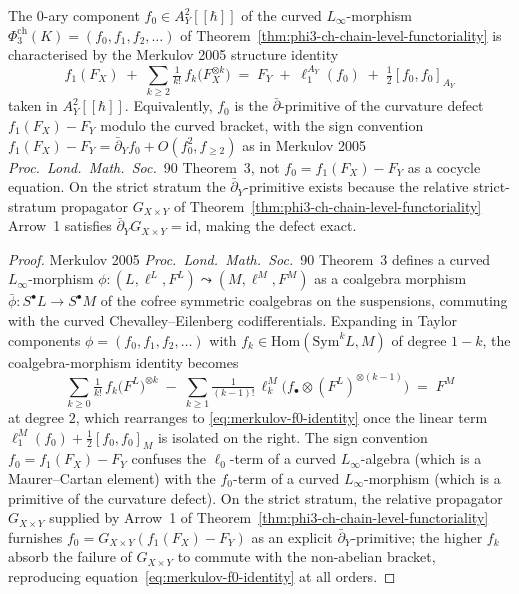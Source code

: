 \begin{proposition}
\label{prop:merkulov-sign-f0}
The $0$-ary component $f_0 \in A_Y^2[\![\hbar]\!]$ of the curved $L_\infty$-morphism $\Phi_3^{\mathrm{ch}}(K) = (f_0, f_1, f_2, \ldots)$ of Theorem~\ref{thm:phi3-ch-chain-level-functoriality} is characterised by the Merkulov 2005 structure identity
\begin{equation}
\label{eq:merkulov-f0-identity}
 f_1(F_X) \;+\; \sum_{k \geq 2} \tfrac{1}{k!}\, f_k\bigl(F_X^{\otimes k}\bigr) \;=\; F_Y \;+\; \ell_1^{A_Y}(f_0) \;+\; \tfrac{1}{2}[f_0, f_0]_{A_Y}
\end{equation}
taken in $A_Y^2[\![\hbar]\!]$. Equivalently, $f_0$ is the $\bar\partial$-primitive of the curvature defect $f_1(F_X) - F_Y$ modulo the curved bracket, with the sign convention $f_1(F_X) - F_Y = \bar\partial_Y f_0 + O(f_0^2, f_{\geq 2})$ as in Merkulov 2005 \textit{Proc.~Lond.~Math.~Soc.}~90 Theorem~3, not $f_0 = f_1(F_X) - F_Y$ as a cocycle equation. On the strict stratum the $\bar\partial_Y$-primitive exists because the relative strict-stratum propagator $G_{X \times Y}$ of Theorem~\ref{thm:phi3-ch-chain-level-functoriality} Arrow~1 satisfies $\bar\partial_Y G_{X \times Y} = \mathrm{id}$, making the defect exact.
\end{proposition}

\begin{proof}
Merkulov 2005 \textit{Proc.~Lond.~Math.~Soc.}~90 Theorem~3 defines a curved $L_\infty$-morphism $\phi \colon (L, \ell^L, F^L) \leadsto (M, \ell^M, F^M)$ as a coalgebra morphism $\bar\phi \colon S^\bullet L \to S^\bullet M$ of the cofree symmetric coalgebras on the suspensions, commuting with the curved Chevalley--Eilenberg codifferentials. Expanding in Taylor components $\phi = (f_0, f_1, f_2, \ldots)$ with $f_k \in \mathrm{Hom}(\mathrm{Sym}^k L, M)$ of degree $1-k$, the coalgebra-morphism identity becomes
\[
 \sum_{k \geq 0} \tfrac{1}{k!}\, f_k\bigl(F^L\bigr)^{\otimes k}
 \;-\; \sum_{k \geq 1} \tfrac{1}{(k-1)!}\, \ell_k^M\bigl(f_\bullet \otimes (F^L)^{\otimes (k-1)}\bigr)
 \;=\; F^M
\]
at degree $2$, which rearranges to \eqref{eq:merkulov-f0-identity} once the linear term $\ell_1^M(f_0) + \tfrac{1}{2}[f_0, f_0]_M$ is isolated on the right. The sign convention $f_0 = f_1(F_X) - F_Y$ confuses the $\ell_0$-term of a curved $L_\infty$-algebra (which is a Maurer--Cartan element) with the $f_0$-term of a curved $L_\infty$-morphism (which is a primitive of the curvature defect). On the strict stratum, the relative propagator $G_{X \times Y}$ supplied by Arrow~1 of Theorem~\ref{thm:phi3-ch-chain-level-functoriality} furnishes $f_0 = G_{X \times Y}(f_1(F_X) - F_Y)$ as an explicit $\bar\partial_Y$-primitive; the higher $f_k$ absorb the failure of $G_{X \times Y}$ to commute with the non-abelian bracket, reproducing equation~\eqref{eq:merkulov-f0-identity} at all orders.
\end{proof}

